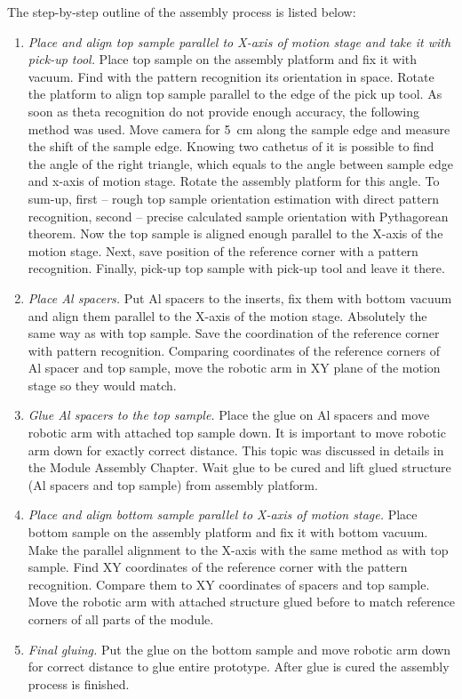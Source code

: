 The step-by-step outline of the assembly process is listed below:

\begin{enumerate}
\setlength\itemsep{-0.5em}
\item \textit{Place and align top sample parallel to X-axis of motion stage and take it with pick-up tool.} Place top sample on the assembly platform and fix it with vacuum. Find with the pattern recognition its orientation in space. Rotate the platform to align top sample parallel to the edge of the pick up tool. As soon as theta recognition do not provide enough accuracy, the following method was used. Move camera for 5~cm along the sample edge and measure the shift of the sample edge. Knowing two cathetus of it is possible to find the angle of the right triangle, which equals to the angle between sample edge and x-axis of motion stage. Rotate the assembly platform for this angle. To sum-up, first -- rough top sample orientation estimation with direct pattern recognition, second -- precise calculated sample orientation with Pythagorean theorem. Now the top sample is aligned enough parallel to the X-axis of the motion stage. Next, save position of the reference corner with a pattern recognition. Finally, pick-up top sample with pick-up tool and leave it there.
\item \textit{Place Al spacers.} Put Al spacers to the inserts, fix them with bottom vacuum and align them parallel to the X-axis of the motion stage. Absolutely the same way as with top sample. Save the coordination of the reference corner with pattern recognition. Comparing coordinates of the reference corners of Al spacer and top sample, move the robotic arm in XY plane of the motion stage so they would match.
\item \textit{Glue Al spacers to the top sample.} Place the glue on Al spacers and move robotic arm with attached top sample down. It is important to move robotic arm down for exactly correct distance. This topic was discussed in details in the Module Assembly Chapter. Wait glue to be cured and lift glued structure (Al spacers and top sample) from assembly platform.
\item \textit{Place and align bottom sample parallel to X-axis of motion stage.} Place bottom sample on the assembly platform and fix it with bottom vacuum. Make the parallel alignment to the X-axis with the same method as with top sample. Find XY coordinates of the reference corner with the pattern recognition. Compare them to XY coordinates of spacers and top sample. Move the robotic arm with attached structure glued before to match reference corners of all parts of the module.
\item \textit{Final gluing.} Put the glue on the bottom sample and move robotic arm down for correct distance to glue entire prototype. After glue is cured the assembly process is finished.
\end{enumerate}

